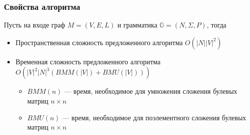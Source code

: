 \documentclass[xcolor=table,aspectratio=169]{beamer}
\begin{document}
\begin{frame}
  \transwipe[direction=90]
  \frametitle{Свойства алгоритма}

Пусть на входе граф $M=(V,E,L)$ и грамматика $\mathbb{G} = (N, \Sigma, P)$, тогда
\begin{itemize} 
\item Пространственная сложность предложенного алгоритма $O(|N||V|^2)$
\item Временная сложность предложенного алгоритма $O(|V|^2 |N|^3(BMM(|V|) + BMU (|V|)))$
\begin{itemize} 
\item $BMM(n)$ --- время, необходимое для умножения сложения булевых матриц $n\times n$
\item $BMU(n)$ --- время, необходимое для поэлементного сложения булевых матриц $n\times n$
\end{itemize}

\end{itemize}

\end{frame}
\end{document}
